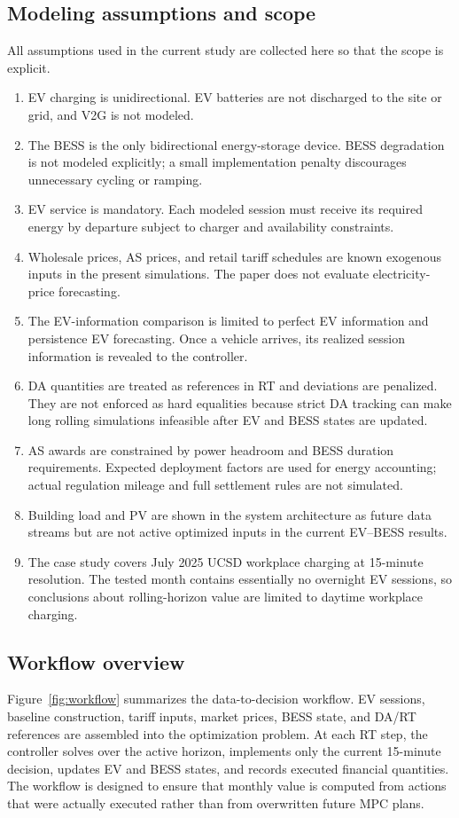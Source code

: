 \documentclass[final,5p,times]{elsarticle}
\begin{document}
\subsection{Modeling assumptions and scope}
\label{sec:assumptions}
All assumptions used in the current study are collected here so that the scope is explicit.
\begin{enumerate}[leftmargin=*]
    \item EV charging is unidirectional. EV batteries are not discharged to the site or grid, and V2G is not modeled.
    \item The BESS is the only bidirectional energy-storage device. BESS degradation is not modeled explicitly; a small implementation penalty discourages unnecessary cycling or ramping.
    \item EV service is mandatory. Each modeled session must receive its required energy by departure subject to charger and availability constraints.
    \item Wholesale prices, AS prices, and retail tariff schedules are known exogenous inputs in the present simulations. The paper does not evaluate electricity-price forecasting.
    \item The EV-information comparison is limited to perfect EV information and persistence EV forecasting. Once a vehicle arrives, its realized session information is revealed to the controller.
    \item DA quantities are treated as references in RT and deviations are penalized. They are not enforced as hard equalities because strict DA tracking can make long rolling simulations infeasible after EV and BESS states are updated.
    \item AS awards are constrained by power headroom and BESS duration requirements. Expected deployment factors are used for energy accounting; actual regulation mileage and full settlement rules are not simulated.
    \item Building load and PV are shown in the system architecture as future data streams but are not active optimized inputs in the current EV--BESS results.
    \item The case study covers July 2025 UCSD workplace charging at 15-minute resolution. The tested month contains essentially no overnight EV sessions, so conclusions about rolling-horizon value are limited to daytime workplace charging.
\end{enumerate}

\subsection{Workflow overview}
Figure~\ref{fig:workflow} summarizes the data-to-decision workflow. EV sessions, baseline construction, tariff inputs, market prices, BESS state, and DA/RT references are assembled into the optimization problem. At each RT step, the controller solves over the active horizon, implements only the current 15-minute decision, updates EV and BESS states, and records executed financial quantities. The workflow is designed to ensure that monthly value is computed from actions that were actually executed rather than from overwritten future MPC plans.
\end{document}
